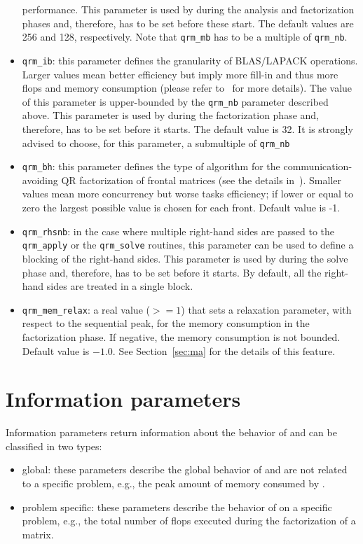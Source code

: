 \documentclass[11pt]{article}
\begin{document}
\begin{itemize}
  performance. This parameter is used by \qrm during the analysis and
  factorization phases and, therefore, has to be set before these
  start. The default values are 256 and 128, respectively. Note that
  \texttt{qrm\_mb} has to be a multiple of \texttt{qrm\_nb}.
\item \texttt{qrm\_ib}: this parameter defines the granularity of
  BLAS/LAPACK operations. Larger values mean better efficiency but
  imply more fill-in and thus more flops and memory consumption
  (please refer to~\cite{butt:11} for more details). The value of this
  parameter is upper-bounded by the \texttt{qrm\_nb} parameter
  described above. This parameter is used by \qrm during the
  factorization phase and, therefore, has to be set before it
  starts. The default value is 32. It is strongly advised to choose,
  for this parameter, a submultiple of \texttt{qrm\_nb}
\item \texttt{qrm\_bh}: this parameter defines the type of algorithm
  for the communication-avoiding QR factorization of frontal matrices
  (see the details in~\cite{a.b.g.l:16}). Smaller values mean more
  concurrency but worse tasks efficiency; if lower or equal to zero
  the largest possible value is chosen for each front. Default value
  is -1.
\item \texttt{qrm\_rhsnb}: in the case where multiple right-hand sides
  are passed to the \texttt{qrm\_apply} or the \texttt{qrm\_solve}
  routines, this parameter can be used to define a blocking of the
  right-hand sides. This parameter is used by \qrm during the solve
  phase and, therefore, has to be set before it starts. By default,
  all the right-hand sides are treated in a single block.
\item \texttt{qrm\_mem\_relax}: a real value ($>=1$) that sets a
  relaxation parameter, with respect to the sequential peak, for the
  memory consumption in the factorization phase. If negative, the
  memory consumption is not bounded. Default value is $-1.0$. See
  Section~\ref{sec:ma} for the details of this feature.
\end{itemize}

\section{Information parameters}
\label{sec:info}

Information parameters return information about the behavior of \qrm
and can be classified in two types:
\begin{itemize}
\item global: these parameters describe the global behavior of \qrm and
  are not related to a specific problem, e.g., the peak amount of
  memory consumed by \qrm.
\item problem specific: these parameters describe the behavior of \qrm
  on a specific problem, e.g., the total number of flops executed
  during the factorization of a matrix.
\end{itemize}
\end{document}
